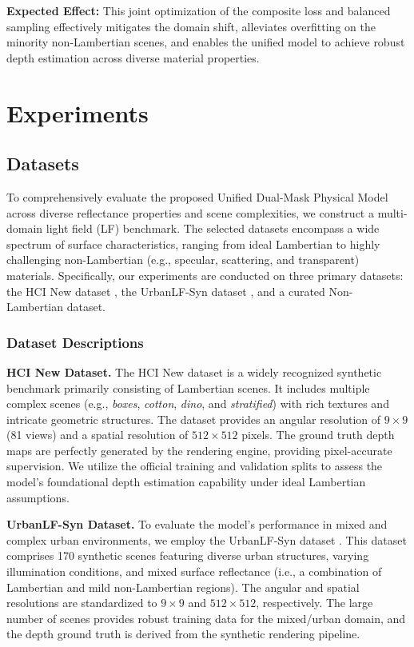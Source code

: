 \documentclass[lettersize,journal]{IEEEtran}
\begin{document}
\textbf{Expected Effect:} This joint optimization of the composite loss and balanced sampling effectively mitigates the domain shift, alleviates overfitting on the minority non-Lambertian scenes, and enables the unified model to achieve robust depth estimation across diverse material properties.

\section{Experiments}

\subsection{Datasets}

To comprehensively evaluate the proposed Unified Dual-Mask Physical Model across diverse reflectance properties and scene complexities, we construct a multi-domain light field (LF) benchmark. The selected datasets encompass a wide spectrum of surface characteristics, ranging from ideal Lambertian to highly challenging non-Lambertian (e.g., specular, scattering, and transparent) materials. Specifically, our experiments are conducted on three primary datasets: the HCI New dataset \cite{visionappl}, the UrbanLF-Syn dataset \cite{nonlamb}, and a curated Non-Lambertian dataset.

\subsubsection{Dataset Descriptions}

\textbf{HCI New Dataset.} The HCI New dataset \cite{visionappl} is a widely recognized synthetic benchmark primarily consisting of Lambertian scenes. It includes multiple complex scenes (e.g., \textit{boxes}, \textit{cotton}, \textit{dino}, and \textit{stratified}) with rich textures and intricate geometric structures. The dataset provides an angular resolution of $9 \times 9$ (81 views) and a spatial resolution of $512 \times 512$ pixels. The ground truth depth maps are perfectly generated by the rendering engine, providing pixel-accurate supervision. We utilize the official training and validation splits to assess the model's foundational depth estimation capability under ideal Lambertian assumptions.

\textbf{UrbanLF-Syn Dataset.} To evaluate the model's performance in mixed and complex urban environments, we employ the UrbanLF-Syn dataset \cite{nonlamb}. This dataset comprises 170 synthetic scenes featuring diverse urban structures, varying illumination conditions, and mixed surface reflectance (i.e., a combination of Lambertian and mild non-Lambertian regions). The angular and spatial resolutions are standardized to $9 \times 9$ and $512 \times 512$, respectively. The large number of scenes provides robust training data for the mixed/urban domain, and the depth ground truth is derived from the synthetic rendering pipeline.
\end{document}
